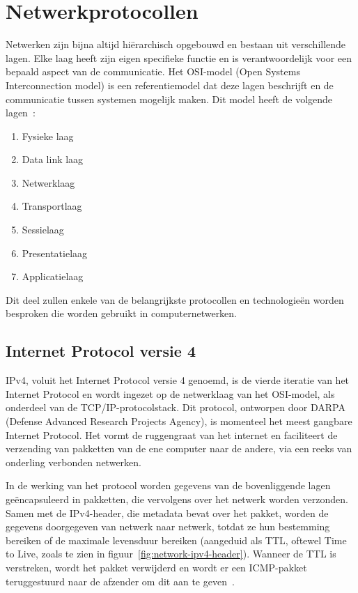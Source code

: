 \section{Netwerkprotocollen}
\label{netwerk_netwerkprotocollen}

Netwerken zijn bijna altijd hi\"erarchisch opgebouwd en bestaan uit verschillende lagen.
Elke laag heeft zijn eigen specifieke functie en is verantwoordelijk voor een bepaald aspect van de communicatie.
Het OSI-model (Open Systems Interconnection model) is een referentiemodel dat deze lagen beschrijft en de communicatie tussen systemen mogelijk maken.
Dit model heeft de volgende lagen~\autocite{tanenbaum1981network}:

\begin{enumerate}
    \item Fysieke laag
    \item Data link laag
    \item Netwerklaag
    \item Transportlaag
    \item Sessielaag
    \item Presentatielaag
    \item Applicatielaag
\end{enumerate}

Dit deel zullen enkele van de belangrijkste protocollen en technologie\"en worden besproken die worden gebruikt in computernetwerken.

\subsection{Internet Protocol versie 4}
\label{netwerk_ipv4}

IPv4, voluit het Internet Protocol versie 4 genoemd, is de vierde iteratie van het Internet Protocol en wordt ingezet op de netwerklaag van het OSI-model, als onderdeel van de TCP/IP-protocolstack.
Dit protocol, ontworpen door DARPA (Defense Advanced Research Projects Agency), is momenteel het meest gangbare Internet Protocol.
Het vormt de ruggengraat van het internet en faciliteert de verzending van pakketten van de ene computer naar de andere, via een reeks van onderling verbonden netwerken.

In de werking van het protocol worden gegevens van de bovenliggende lagen ge\"encapsuleerd in pakketten, die vervolgens over het netwerk worden verzonden.
Samen met de IPv4-header, die metadata bevat over het pakket, worden de gegevens doorgegeven van netwerk naar netwerk, totdat ze hun bestemming bereiken of de maximale levensduur bereiken (aangeduid als TTL, oftewel Time to Live, zoals te zien in figuur~\ref{fig:network-ipv4-header}).
Wanneer de TTL is verstreken, wordt het pakket verwijderd en wordt er een ICMP-pakket teruggestuurd naar de afzender om dit aan te geven~\autocite{dordal2020}.


